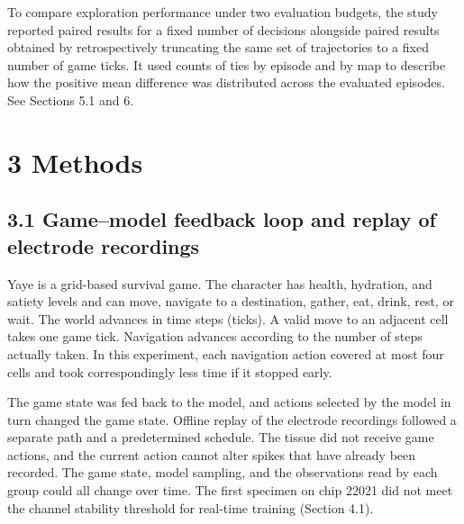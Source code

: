 \documentclass{article}
\begin{document}
To compare exploration performance under two evaluation budgets, the study reported paired results for a fixed number of decisions alongside paired results obtained by retrospectively truncating the same set of trajectories to a fixed number of game ticks. It used counts of ties by episode and by map to describe how the positive mean difference was distributed across the evaluated episodes. See Sections 5.1 and 6.


\section*{3 Methods}


\subsection*{3.1 Game--model feedback loop and replay of electrode recordings}


Yaye is a grid-based survival game. The character has health, hydration, and satiety levels and can move, navigate to a destination, gather, eat, drink, rest, or wait. The world advances in time steps (ticks). A valid move to an adjacent cell takes one game tick. Navigation advances according to the number of steps actually taken. In this experiment, each navigation action covered at most four cells and took correspondingly less time if it stopped early.


The game state was fed back to the model, and actions selected by the model in turn changed the game state. Offline replay of the electrode recordings followed a separate path and a predetermined schedule. The tissue did not receive game actions, and the current action cannot alter spikes that have already been recorded. The game state, model sampling, and the observations read by each group could all change over time. The first specimen on chip 22021 did not meet the channel stability threshold for real-time training (Section 4.1).
\end{document}
